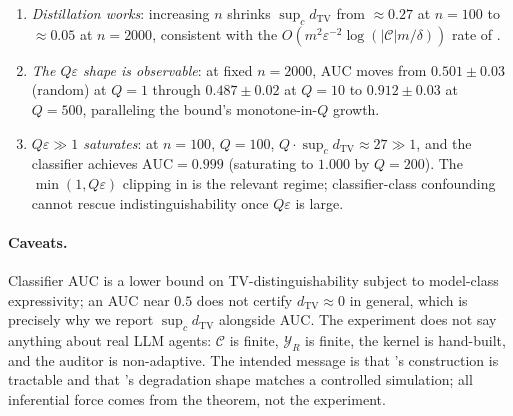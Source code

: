 \documentclass{article}
\theoremstyle{plain}
\theoremstyle{definition}
\theoremstyle{remark}
\newcommand{\TV}{\mathrm{TV}}
\newcommand{\dtv}{d_{\TV}}
\newcommand{\C}{\mathcal{C}}
\newcommand{\YR}{\mathcal{Y}_R}
\begin{document}
\begin{enumerate}
  \item \emph{Distillation works}: increasing $n$ shrinks $\sup_c \dtv$ from
    $\approx 0.27$ at $n = 100$ to $\approx 0.05$ at $n = 2000$, consistent
    with the $O(m^2 \varepsilon^{-2} \log(|\C| m / \delta))$ rate of
    .
  \item \emph{The $Q\varepsilon$ shape is observable}: at fixed $n = 2000$,
    AUC moves from $0.501 \pm 0.03$ (random) at $Q=1$ through
    $0.487 \pm 0.02$ at $Q=10$ to $0.912 \pm 0.03$ at $Q=500$,
    paralleling the bound's monotone-in-$Q$ growth.
  \item \emph{$Q\varepsilon \gg 1$ saturates}: at $n = 100$, $Q = 100$,
    $Q \cdot \sup_c \dtv \approx 27 \gg 1$, and the classifier achieves
    $\mathrm{AUC} = 0.999$ (saturating to $1.000$ by $Q=200$). The
    $\min(1, Q\varepsilon)$ clipping in  is the
    relevant regime; classifier-class confounding cannot rescue
    indistinguishability once $Q\varepsilon$ is large.
\end{enumerate}

\paragraph{Caveats.}
Classifier AUC is a lower bound on TV-distinguishability subject to model-class
expressivity; an AUC near $0.5$ does not certify $\dtv \approx 0$ in general,
which is precisely why we report $\sup_c \dtv$ alongside AUC. The experiment
does not say anything about real LLM agents: $\C$ is finite, $\YR$ is finite,
the kernel is hand-built, and the auditor is non-adaptive. The intended message
is that 's construction is tractable and that
's degradation shape matches a controlled simulation; all
inferential force comes from the theorem, not the experiment.
\end{document}
